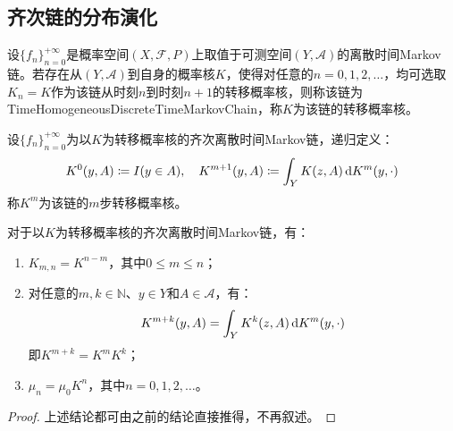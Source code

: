 \subsection{齐次链的分布演化}
\begin{definition}
	设$\{f_n\}_{n=0}^{+\infty}$是概率空间$(X,\mathscr{F},P)$上取值于可测空间$(Y,\mathscr{A})$的离散时间Markov链。若存在从$(Y,\mathscr{A})$到自身的概率核$K$，使得对任意的$n=0,1,2,\dots$，均可选取$K_n=K$作为该链从时刻$n$到时刻$n+1$的转移概率核，则称该链为\gls{TimeHomogeneousDiscreteTimeMarkovChain}，称$K$为该链的转移概率核。
\end{definition}
\begin{definition}
	设$\{f_n\}_{n=0}^{+\infty}$为以$K$为转移概率核的齐次离散时间Markov链，递归定义：
	\begin{gather*}
		K^0(y,A)\coloneq I(y\in A),\quad K^{m+1}(y,A)\coloneq\int_{Y}K(z,A)\mathop{}\!\mathrm{d} K^m(y,\cdot)
	\end{gather*}
	称$K^m$为该链的$m$步转移概率核。
\end{definition}
\begin{property}\label{prop:HomogeneousMarkovEvolution}
	对于以$K$为转移概率核的齐次离散时间Markov链，有：
	\begin{enumerate}
		\item $K_{m,n}=K^{n-m}$，其中$0\leqslant m\leqslant n$；
		\item 对任意的$m,k\in\mathbb{N}$、$y\in Y$和$A\in\mathscr{A}$，有：
		\begin{equation*}
			K^{m+k}(y,A)=\int_{Y}K^k(z,A)\mathop{}\!\mathrm{d} K^m(y,\cdot)
		\end{equation*}
		即$K^{m+k}=K^mK^k$；
		\item $\mu_n=\mu_0K^n$，其中$n=0,1,2,\dots$。
	\end{enumerate}
\end{property}
\begin{proof}
	上述结论都可由之前的结论直接推得，不再叙述。
\end{proof}
